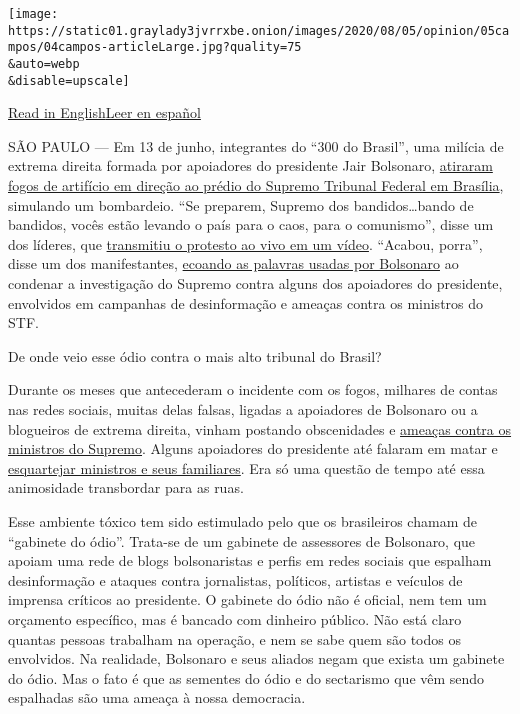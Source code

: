 \texttt{[image: https://static01.graylady3jvrrxbe.onion/images/2020/08/05/opinion/05campos/04campos-articleLarge.jpg?quality=75\\\&auto=webp\\\&disable=upscale]}

\href{https://www.nytimes3xbfgragh.onion/2020/08/04/opinion/bolsonaro-office-of-hate-brazil.html}{Read
in
English}\href{https://www.nytimes3xbfgragh.onion/es/2020/08/04/espanol/opinion/bolsonaro-oficina-odio-brasil.html}{Leer
en español}

SÃO PAULO --- Em 13 de junho, integrantes do ``300 do Brasil'', uma
milícia de extrema direita formada por apoiadores do presidente Jair
Bolsonaro,
\href{https://www1.folha.uol.com.br/poder/2020/05/sara-winter-xinga-moraes-diz-querer-trocar-socos-com-ele-e-promete-inferniza-lo.shtml}{atiraram
fogos de artifício em direção ao prédio do Supremo Tribunal Federal em
Brasília}, simulando um bombardeio. ``Se preparem, Supremo dos
bandidos\ldots{}bando de bandidos, vocês estão levando o país para o
caos, para o comunismo'', disse um dos líderes, que
\href{https://www.metropoles.com/brasil/video-bolsonaristas-lancam-fogos-de-artificio-em-predio-do-stf}{transmitiu
o protesto ao vivo em um vídeo}. ``Acabou, porra'', disse um dos
manifestantes,
\href{https://www.youtube.com/watch?v=I2bZoC8FHJI}{ecoando as palavras
usadas por Bolsonaro} ao condenar a investigação do Supremo contra
alguns dos apoiadores do presidente, envolvidos em campanhas de
desinformação e ameaças contra os ministros do STF.

De onde veio esse ódio contra o mais alto tribunal do Brasil?

Durante os meses que antecederam o incidente com os fogos, milhares de
contas nas redes sociais, muitas delas falsas, ligadas a apoiadores de
Bolsonaro ou a blogueiros de extrema direita, vinham postando
obscenidades e
\href{https://www1.folha.uol.com.br/poder/2020/05/sara-winter-xinga-moraes-diz-querer-trocar-socos-com-ele-e-promete-inferniza-lo.shtml}{ameaças
contra os ministros do Supremo}. Alguns apoiadores do presidente até
falaram em matar e
\href{https://g1.globo.com/politica/noticia/2020/06/17/moraes-vota-pela-legalidade-e-continuidade-do-inquerito-das-fake-news.ghtml}{esquartejar
ministros e seus familiares}. Era só uma questão de tempo até essa
animosidade transbordar para as ruas.

Esse ambiente tóxico tem sido estimulado pelo que os brasileiros chamam
de ``gabinete do ódio''. Trata-se de um gabinete de assessores de
Bolsonaro, que apoiam uma rede de blogs bolsonaristas e perfis em redes
sociais que espalham desinformação e ataques contra jornalistas,
políticos, artistas e veículos de imprensa críticos ao presidente. O
gabinete do ódio não é oficial, nem tem um orçamento específico, mas é
bancado com dinheiro público. Não está claro quantas pessoas trabalham
na operação, e nem se sabe quem são todos os envolvidos. Na realidade,
Bolsonaro e seus aliados negam que exista um gabinete do ódio. Mas o
fato é que as sementes do ódio e do sectarismo que vêm sendo espalhadas
são uma ameaça à nossa democracia.

